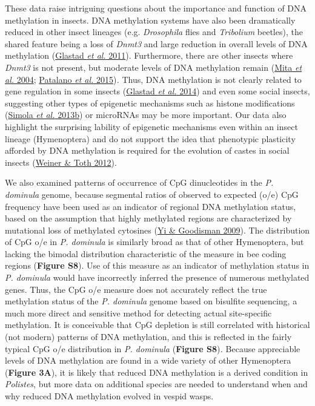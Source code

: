 These data raise intriguing questions about the importance and function
of DNA methylation in insects. DNA methylation systems have also been
dramatically reduced in other insect lineages (e.g. \textit{Drosophila}
flies and \textit{Tribolium} beetles), the shared feature being a loss of
\textit{Dnmt3} and large reduction in overall levels of DNA methylation
(\protect\hyperlink{ux5fENREFux5f13}{Glastad \textit{et al.} 2011}).
Furthermore, there are other insects where \textit{Dnmt3} is not present,
but moderate levels of DNA methylation remain
(\protect\hyperlink{ux5fENREFux5f36}{Mita \textit{et al.} 2004};
\protect\hyperlink{ux5fENREFux5f43}{Patalano \textit{et al.}
2015})\textit{.} Thus, DNA methylation is not clearly related to gene
regulation in some insects (\protect\hyperlink{ux5fENREFux5f12}{Glastad
\textit{et al.} 2014}) and even some social insects, suggesting other
types of epigenetic mechanisms such as histone modifications
(\protect\hyperlink{ux5fENREFux5f53}{Simola \textit{et al.} 2013b}) or
microRNAs may be more important. Our data also highlight the surprising
lability of epigenetic mechanisms even within an insect lineage
(Hymenoptera) and do not support the idea that phenotypic plasticity
afforded by DNA methylation is required for the evolution of castes in
social insects (\protect\hyperlink{ux5fENREFux5f68}{Weiner \& Toth
2012}).

We also examined patterns of occurrence of CpG dinucleotides in the
\textit{P. dominula} genome, because segmental ratios of observed to
expected (o/e) CpG frequency have been used as an indicator of regional
DNA methylation status, based on the assumption that highly methylated
regions are characterized by mutational loss of methylated cytosines
(\protect\hyperlink{ux5fENREFux5f76}{Yi \& Goodisman 2009}). The
distribution of CpG o/e in \textit{P. dominula} is similarly broad as that
of other Hymenoptera, but lacking the bimodal distribution
characteristic of the measure in bee coding regions (\textbf{Figure
S8}). Use of this measure as an indicator of methylation status in
\textit{P. dominula} would have incorrectly inferred the presence of
numerous methylated genes. Thus, the CpG o/e measure does not accurately
reflect the true methylation status of the \textit{P. dominula} genome
based on bisulfite sequencing, a much more direct and sensitive method
for detecting actual site-specific methylation. It is conceivable that
CpG depletion is still correlated with historical (not modern) patterns
of DNA methylation, and this is reflected in the fairly typical CpG o/e
distribution in \textit{P. dominula} (\textbf{Figure S8})\textit{.} Because
appreciable levels of DNA methylation are found in a wide variety of
other Hymenoptera (\textbf{Figure 3A}), it is likely that reduced DNA
methylation is a derived condition in \textit{Polistes}, but more data on
additional species are needed to understand when and why reduced DNA
methylation evolved in vespid wasps.

